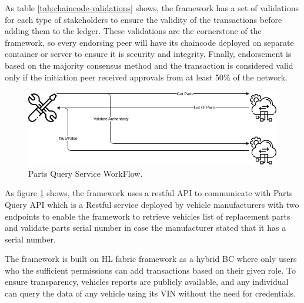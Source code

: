 As table \ref{tab:chaincode-validations}
shows, the framework has a set of validations for each type of stakeholders to ensure the validity of the transactions before
adding them to the ledger. These validations are the cornerstone of the framework, so every endorsing peer will have its chaincode deployed
on separate container or server to ensure it is security and integrity. Finally, endorsement is based on the majority consensus method and
the transaction is considered valid only if the initiation peer received approvals from at least 50\% of the network.
\begin{figure}[H]
	\centering
	\includegraphics[width=\linewidth]{figures/parts-service-wf}
	\caption{Parts Query Service WorkFlow.}
	\label{fig:parts-query-wf}
\end{figure}

As figure \ref{fig:parts-query-wf}
shows, the framework uses a restful API to communicate with Parts Query API which is a Restful service deployed by vehicle
manufacturers with two endpoints to enable the framework to retrieve vehicles list of replacement parts and validate parts serial number in
case the manufacturer stated that it has a serial number. 


The framework is built on HL fabric framework as a hybrid BC where only users who the sufficient permissions can
add transactions based on their given role. To ensure transparency, vehicles reports are publicly available, and any individual
can query the data of any vehicle using its VIN without the need for credentials. 

